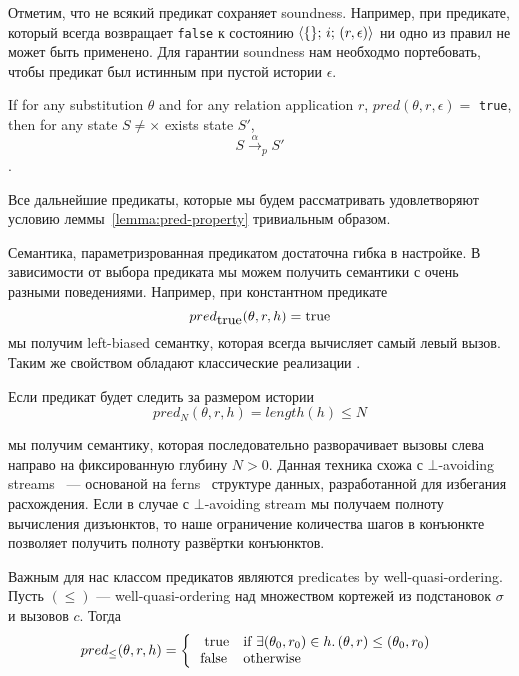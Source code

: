 Отметим, что не всякий предикат сохраняет soundness. Например, при предикате, который всегда возвращает \lstinline{false} к состоянию $\langle \{\};\, i; \, (r, \epsilon) \rangle$ ни одно из правил не может быть применено. Для гарантии soundness нам необходмо портебовать, чтобы предикат был истинным при пустой истории $\epsilon$.

\begin{lemma}
\label{lemma:pred-property}
 If for any substitution $\theta$ and for any relation application $r$,  $pred(\theta, r, \epsilon) =$ \lstinline{true}, then for any state $S \not= \times$ exists state $S'$, 
 $$S \xrightarrow{\alpha}_p S'$$.
\end{lemma}

Все дальнейшие предикаты, которые мы будем рассматривать удовлетворяют условию леммы~\ref{lemma:pred-property} тривиальным образом.

Семантика, параметризрованная предикатом достаточна гибка в настройке. В зависимости от выбора предиката мы можем получить семантики с очень разными поведениями. Например, при константном предикате
\[
pred_{\mbox{\lstinline{true}}}(\theta, r, h) = \mbox{\lstinline{true}} 
\]
\noindent мы получим left-biased семантку, которая всегда вычисляет самый левый вызов. Таким же свойством обладают классические реализации \mk.

Если предикат будет следить за размером истории
\[
pred_N(\theta, r, h) =  length(h) \leq N
\]

\noindent мы получим семантику, которая последовательно разворачивает вызовы слева направо на фиксированную глубину $N > 0$. Данная техника схожа с $\bot$-avoiding streams~\cite{fair:WillThesis} --- основаной на ferns~\cite{fair:ferns} структуре данных, разработанной для избегания расхождения. Если в случае с $\bot$-avoiding stream мы получаем полноту вычисления дизъюнктов, то наше ограничение количества шагов в конъюнкте позволяет получить полноту развёртки конъюнктов.

Важным для нас классом предикатов являются predicates by well-quasi-ordering. Пусть $(\leq)$ --- well-quasi-ordering над множеством кортежей из подстановок $\sigma$ и вызовов $c$. Тогда
\[
pred_\leq(\theta, r, h) = \left\{
\begin{array}{rl}
\mbox{\lstinline{true}}  & \mbox{if } \exists (\theta_0, r_0) \in h. \, (\theta, r) \leq (\theta_0, r_0) \\
\mbox{\lstinline{false}} & \mbox{otherwise}
\end{array}
\right.
\]

